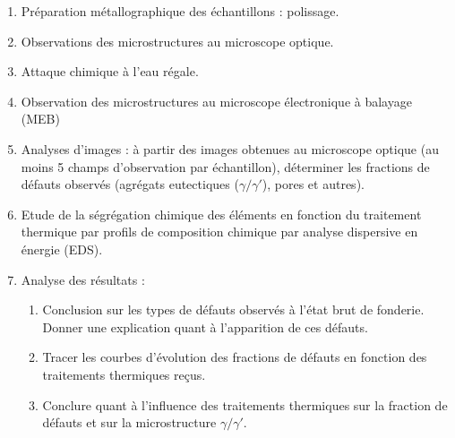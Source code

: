 
\begin{enumerate}
    \item Préparation métallographique des échantillons : polissage.
    \item Observations des microstructures au microscope optique.
    \item Attaque chimique à l’eau régale.
    \item Observation des microstructures au microscope électronique à balayage (MEB)
    \item Analyses d’images : à partir des images obtenues au microscope optique (au moins 5 champs d’observation par échantillon), déterminer les fractions de défauts observés (agrégats
    eutectiques ($\gamma / \gamma'$), pores et autres).
    \item Etude de la ségrégation chimique des éléments en fonction du traitement thermique par
    profils de composition chimique par analyse dispersive en énergie (EDS).
    \item Analyse des résultats :
        \begin{enumerate}
            \item Conclusion sur les types de défauts observés à l’état brut de fonderie. Donner une explication quant à l’apparition de ces défauts.
            \item Tracer les courbes d’évolution des fractions de défauts en fonction des traitements thermiques reçus.
            \item Conclure quant à l’influence des traitements thermiques sur la fraction de défauts et sur la microstructure $\gamma / \gamma'$. 
        \end{enumerate}
\end{enumerate}

